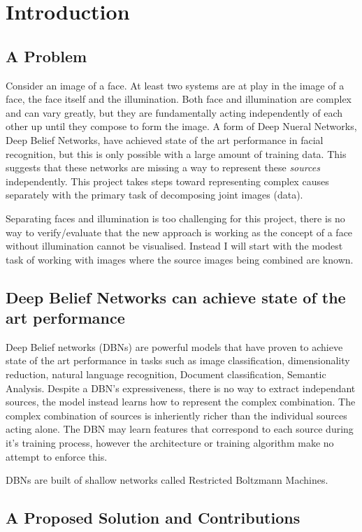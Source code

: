\chapter{Introduction}


\section{A Problem}
Consider an image of a face. At least two systems are at play in the image of a face, the face itself and the illumination. Both face and illumination are complex and can vary greatly, but they are fundamentally acting independently of each other up until they compose to form the image.
A form of Deep Nueral Networks, Deep Belief Networks, have achieved state of the art performance in facial recognition, but this is only possible with a large amount of training data. This suggests that these networks are missing a way to represent these \emph{sources} independently. This project takes steps toward representing complex causes separately with the primary task of decomposing joint images (data).

Separating faces and illumination is too challenging for this project, there is no way to verify/evaluate that the new approach is working as the concept of a face without illumination cannot be visualised. Instead I will start with the modest task of working with images where the source images being combined are known.

\section{Deep Belief Networks can achieve state of the art performance}
Deep Belief networks (DBNs) are powerful models that have proven to achieve state of the art performance in tasks such as image classification, dimensionality reduction, natural language recognition, Document classification, Semantic Analysis.\todocite{}
Despite a DBN's expressiveness, there is no way to extract independant sources, the model instead learns how to represent the complex combination. The complex combination of sources is inheriently richer than the individual sources acting alone. The DBN may learn features that correspond to each source during it's training process, however the architecture or training algorithm make no attempt to enforce this.

DBNs are built of shallow networks called Restricted Boltzmann Machines.

\section{A Proposed Solution and Contributions}

